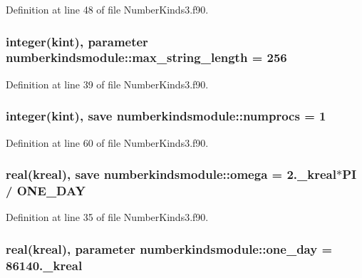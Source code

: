 Definition at line 48 of file Number\+Kinds3.\+f90.

\hypertarget{classnumberkindsmodule_acdff91cebc15eb3a5c7a453345454ae4}{
\subsubsection[{max\+\_\+string\+\_\+length}]{\setlength{\rightskip}{0pt plus 5cm}integer({\bf kint}), parameter numberkindsmodule\+::max\+\_\+string\+\_\+length = 256}}\label{classnumberkindsmodule_acdff91cebc15eb3a5c7a453345454ae4}


Definition at line 39 of file Number\+Kinds3.\+f90.

\hypertarget{classnumberkindsmodule_af9edcbb4a68ceff7853d6b30d97dbae7}{
\subsubsection[{numprocs}]{\setlength{\rightskip}{0pt plus 5cm}integer({\bf kint}), save numberkindsmodule\+::numprocs = 1}}\label{classnumberkindsmodule_af9edcbb4a68ceff7853d6b30d97dbae7}


Definition at line 60 of file Number\+Kinds3.\+f90.

\hypertarget{classnumberkindsmodule_a924b4999227b1dfbd01844eaf4485508}{
\subsubsection[{omega}]{\setlength{\rightskip}{0pt plus 5cm}real({\bf kreal}), save numberkindsmodule\+::omega = 2.\+\_\+kreal$\ast$\+P\+I / O\+N\+E\+\_\+\+D\+A\+Y}}\label{classnumberkindsmodule_a924b4999227b1dfbd01844eaf4485508}


Definition at line 35 of file Number\+Kinds3.\+f90.

\hypertarget{classnumberkindsmodule_a17524d8d05103095fa941ef39ed6d386}{
\subsubsection[{one\+\_\+day}]{\setlength{\rightskip}{0pt plus 5cm}real({\bf kreal}), parameter numberkindsmodule\+::one\+\_\+day = 86140.\+\_\+kreal}}\label{classnumberkindsmodule_a17524d8d05103095fa941ef39ed6d386}


